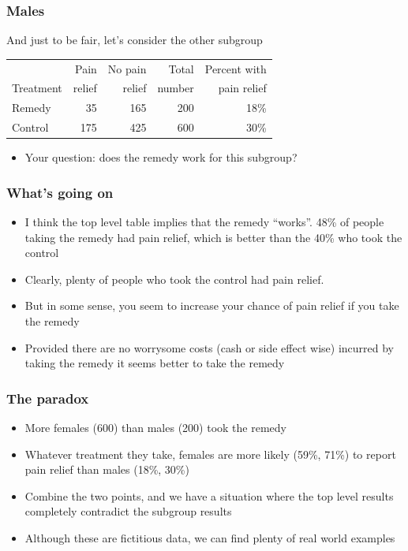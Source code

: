 {\begin{frame}[label=simpson3]
  \frametitle{Males}

And just to be fair, let's consider the other subgroup

\begin{center}
\begin{tabular}{|l|r|r|r|r|}
\hline
&  Pain &  No pain  & Total  &  Percent with\\
Treatment & relief & relief & number & pain relief \\
\hline
Remedy &    35 &  165  & 200 & {\color{red}18\%}\\
Control & 175  & 425 & 600 & {\color{red}30\%}\\
\hline
\end{tabular}
\end{center}

\begin{itemize}
\item Your question: does the remedy work for this subgroup?
\end{itemize}

\end{frame}


\begin{frame}[label=simpson4]
\frametitle{What's going on}

\begin{itemize}
\item<1-> I think the top level table implies that the remedy ``works''.   48\% of people taking the remedy had pain relief, which is better than the 40\% who took the control
\item<2-> Clearly, plenty of people who took the control had pain relief.  
\item<3-> But in some sense, you seem to increase your chance of pain relief if you take the remedy
\item<4-> Provided there are no worrysome costs (cash or side effect wise) incurred by taking the remedy it seems better to take the remedy
\end{itemize}

\end{frame}


\begin{frame}[label=simpson5]
\frametitle{The paradox}

\begin{itemize}
\item More females (600) than males (200) took the remedy
\item Whatever treatment they take, females are more likely (59\%, 71\%) to report pain relief than males (18\%, 30\%)
\item Combine the two points, and we have a situation where the top level results completely contradict the subgroup results
\item Although these are fictitious data, we can find plenty of real world examples
\end{itemize}


\end{frame}}
